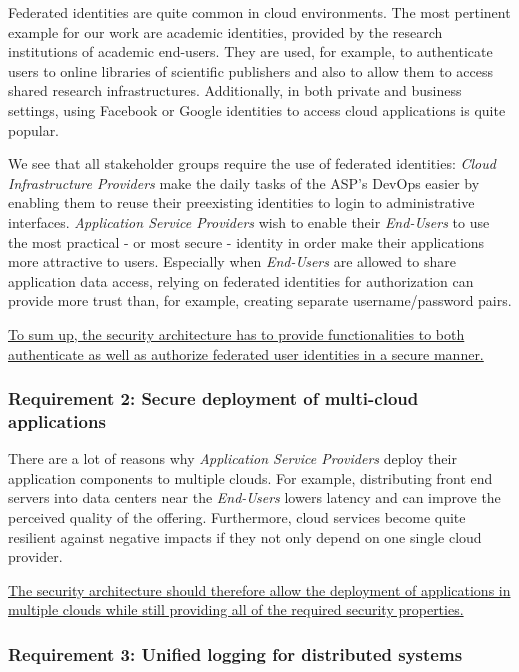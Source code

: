 \documentclass{llncs}
\begin{document}
Federated identities are quite common in cloud environments. The most pertinent example for our work are academic identities, provided by the research institutions of academic end-users. They are used, for example, to authenticate users to online libraries of scientific publishers and also to allow them to access shared research infrastructures. Additionally, in both private and business settings, using Facebook or Google identities to access cloud applications is quite popular.

We see that all stakeholder groups require the use of federated identities: \textit{Cloud Infrastructure Providers} make the daily tasks of the ASP's DevOps easier by enabling them to reuse their preexisting identities to login to administrative interfaces. \textit{Application Service Providers} wish to enable their \textit{End-Users} to use the most practical - or most secure - identity in order make their applications more attractive to users. Especially when \textit{End-Users} are allowed to share application data access, relying on federated identities for authorization can provide more trust than, for example, creating separate username/password pairs.

\ul{To sum up, the security architecture has to provide functionalities to both authenticate as well as authorize federated user identities in a secure manner.}

\subsubsection{Requirement 2: Secure deployment of multi-cloud applications}

There are a lot of reasons why \textit{Application Service Providers} deploy their application components to multiple clouds. For example, distributing front end servers into data centers near the \textit{End-Users} lowers latency and can improve the perceived quality of the offering. Furthermore, cloud services become quite resilient against negative impacts if they not only depend on one single cloud provider.

\ul{The security architecture should therefore allow the deployment of applications in multiple clouds while still providing all of the required security properties.}

\subsubsection{Requirement 3: Unified logging for distributed systems}
\end{document}

